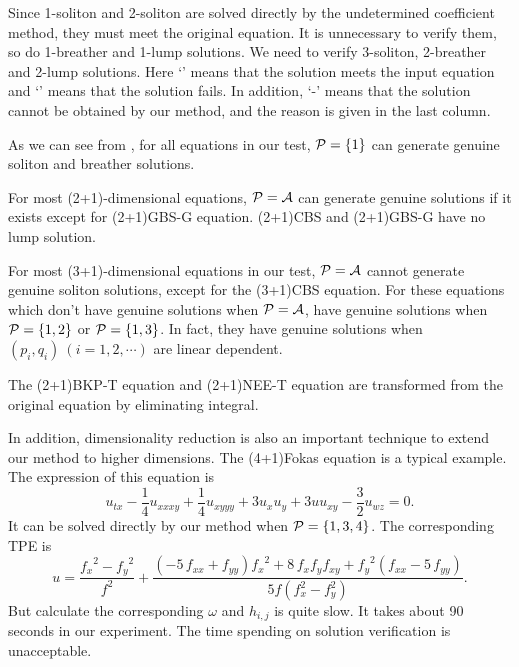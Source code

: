 Since 1-soliton and 2-soliton are solved directly by the undetermined coefficient method, they must meet the original equation. 
It is unnecessary to verify them, so do 1-breather and 1-lump solutions. We need to verify 3-soliton, 2-breather and 2-lump solutions. Here `\VTRUE' means that the solution meets the input equation and `\VFALSE' means that the solution fails. In addition, `-' means that the solution cannot be obtained by our method, and the reason is given in the last column. 

As we can see from , for all equations in our test, $\mathcal{P}=\{1\}$ can generate genuine soliton and breather solutions. 

For most (2+1)-dimensional equations, $\mathcal{P}= \mathcal{A}$ can generate genuine solutions if it exists except for (2+1)GBS-G equation. (2+1)CBS and (2+1)GBS-G have no lump solution. 

For most (3+1)-dimensional equations in our test, $\mathcal{P}= \mathcal{A}$ cannot generate genuine soliton solutions, except for the (3+1)CBS equation. For these equations which don't have genuine solutions when $\mathcal{P}= \mathcal{A}$, have genuine solutions when $\mathcal{P}=\{1,2\}$ or $\mathcal{P}=\{1,3\}$. In fact, they have genuine solutions when $(p_i,q_i)~(i=1,2,\cdots)$ are linear dependent.

The (2+1)BKP-T equation and (2+1)NEE-T equation are transformed from the original equation by eliminating integral.  

In addition, dimensionality reduction is also an important technique to extend our method to higher dimensions. The (4+1)Fokas equation \CITEdaFokas{} is a typical example. The expression of this equation is 
\begin{equation}
    u_{tx}-\frac{1}{4}u_{xxxy}+\frac{1}{4}u_{xyyy}+3u_xu_y+3uu_{xy}-\frac{3}{2}u_{wz}=0. \label{Fokas}
\end{equation}
It can be solved directly by our method when $\mathcal{P}=\{1,3,4\}$. The corresponding TPE is
\begin{equation}
u={\frac {{f_{{x}}}^{2}-{f_{{y}}}^{2}}{{f}^{2}}}+{\frac { \left( -5\,f_{
{{ xx}}}+f_{{{ yy}}} \right) {f_{{x}}}^{2}+8\,f_{{x}}f_{{y}}f_{{
{ xy}}}+{f_{{y}}}^{2} \left( f_{{{ xx}}}-5\,f_{{{ yy}}}
\right) }{5f(f_x^2-f_y^2)}}.
\end{equation}
But calculate the corresponding $\omega$ and $h_{i,j}$ is quite slow. It takes about 90 seconds in our experiment. The time spending on solution verification is unacceptable.

